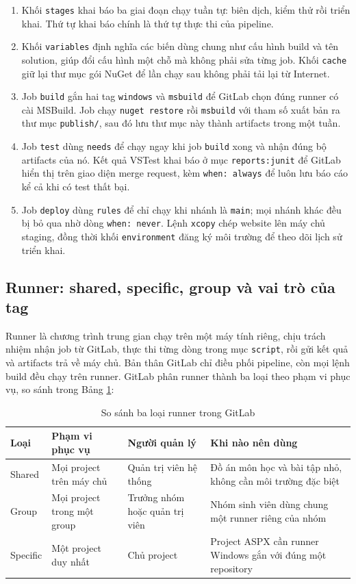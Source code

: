 \begin{enumerate}
\item Khối \verb|stages| khai báo ba giai đoạn chạy tuần tự: biên dịch, kiểm thử rồi triển khai.
Thứ tự khai báo chính là thứ tự thực thi của pipeline.
\item Khối \verb|variables| định nghĩa các biến dùng chung như cấu hình build và tên solution,
giúp đổi cấu hình một chỗ mà không phải sửa từng job. Khối \verb|cache| giữ lại thư mục gói NuGet
để lần chạy sau không phải tải lại từ Internet.
\item Job \verb|build| gắn hai tag \verb|windows| và \verb|msbuild| để GitLab chọn đúng runner có
cài MSBuild. Job chạy \verb|nuget restore| rồi \verb|msbuild| với tham số xuất bản ra thư mục
\verb|publish/|, sau đó lưu thư mục này thành artifacts trong một tuần.
\item Job \verb|test| dùng \verb|needs| để chạy ngay khi job \verb|build| xong và nhận đúng bộ
artifacts của nó. Kết quả VSTest khai báo ở mục \verb|reports:junit| để GitLab hiển thị trên giao
diện merge request, kèm \verb|when: always| để luôn lưu báo cáo kể cả khi có test thất bại.
\item Job \verb|deploy| dùng \verb|rules| để chỉ chạy khi nhánh là \verb|main|; mọi nhánh khác đều
bị bỏ qua nhờ dòng \verb|when: never|. Lệnh \verb|xcopy| chép website lên máy chủ staging, đồng thời
khối \verb|environment| đăng ký môi trường để theo dõi lịch sử triển khai.
\end{enumerate}

\subsection{Runner: shared, specific, group và vai trò của tag}

Runner là chương trình trung gian chạy trên một máy tính riêng, chịu trách nhiệm nhận job từ
GitLab, thực thi từng dòng trong mục \verb|script|, rồi gửi kết quả và artifacts trả về máy chủ.
Bản thân GitLab chỉ điều phối pipeline, còn mọi lệnh build đều chạy trên runner. GitLab phân
runner thành ba loại theo phạm vi phục vụ, so sánh trong Bảng \ref{tab:c52-runner}:
\begin{table}[H]
\centering
\caption{So sánh ba loại runner trong GitLab}
\label{tab:c52-runner}
\begin{tabular}{p{1.6cm}p{2.6cm}p{2.4cm}p{3.8cm}}
\toprule
Loại & Phạm vi phục vụ & Người quản lý & Khi nào nên dùng \\
\midrule
Shared & Mọi project trên máy chủ & Quản trị viên hệ thống & Đồ án môn học và bài tập nhỏ, không cần môi trường đặc biệt \\
Group & Mọi project trong một group & Trưởng nhóm hoặc quản trị viên & Nhóm sinh viên dùng chung một runner riêng của nhóm \\
Specific & Một project duy nhất & Chủ project & Project ASPX cần runner Windows gắn với đúng một repository \\
\bottomrule
\end{tabular}
\end{table}

